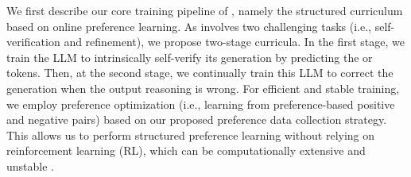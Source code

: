 We first describe our core training pipeline of \sname, namely the structured curriculum based on online preference learning.  As \sname involves two challenging tasks (i.e., self-verification and refinement), we propose two-stage curricula. In the first stage, we train the LLM to intrinsically self-verify its generation by predicting the \eos or \rethink tokens. Then, at the second stage, we continually train this LLM to correct the generation when the output reasoning is wrong. For efficient and stable training, we employ preference optimization (i.e., learning from preference-based positive and negative pairs) based on our proposed preference data collection strategy. This allows us to perform structured preference learning without relying on reinforcement learning (RL), which can be computationally extensive and unstable \citep{rafailov2023DPO}.


